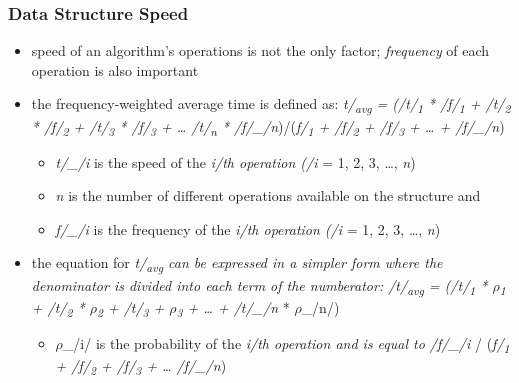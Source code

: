 \documentclass[11pt]{article}
\begin{document}
\subsubsection{Data Structure Speed}
\label{sec:org747f8c0}
\begin{itemize}
\item speed of an algorithm's operations is not the only factor; \emph{frequency} of each operation is also important
\item the frequency-weighted average time is defined as:
\emph{t/\textsubscript{avg} = (/t/\textsubscript{1} * /f/\textsubscript{1} + /t/\textsubscript{2} * /f/\textsubscript{2} + /t/\textsubscript{3} * /f/\textsubscript{3} + \ldots{} /t/\textsubscript{n} * /f/\_/n})/(\emph{f/\textsubscript{1} + /f/\textsubscript{2} + /f/\textsubscript{3} + \ldots{} + /f/\_/n})
\begin{itemize}
\item \emph{t/\_/i} is the speed of the \emph{i/th operation (/i} = 1, 2, 3, \ldots{}, \emph{n})
\item \emph{n} is the number of different operations available on the structure
and
\item \emph{f/\_/i} is the frequency of the \emph{i/th operation (/i} = 1, 2, 3, \ldots{}, \emph{n})
\end{itemize}
\item the equation for \emph{t/\textsubscript{avg} can be expressed in a simpler form where the denominator is divided into each term of the numberator:
/t/\textsubscript{avg} = (/t/\textsubscript{1} * \(\rho\)\textsubscript{1} + /t/\textsubscript{2} * \(\rho\)\textsubscript{2} + /t/\textsubscript{3} + \(\rho\)\textsubscript{3} + \ldots{} + /t/\_/n} * \(\rho\)\_/n/)
\begin{itemize}
\item \(\rho\)\_/i/ is the probability of the \emph{i/th operation and is equal to /f/\_/i} / (\emph{f/\textsubscript{1} + /f/\textsubscript{2} + /f/\textsubscript{3} + \ldots{} /f/\_/n})
\end{itemize}
\end{itemize}
\end{document}
